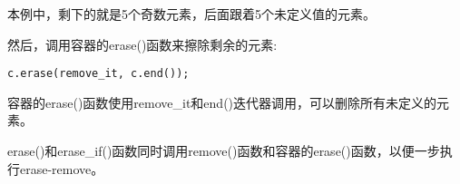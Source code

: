 本例中，剩下的就是5个奇数元素，后面跟着5个未定义值的元素。

然后，调用容器的erase()函数来擦除剩余的元素:

\begin{lstlisting}[style=styleCXX]
c.erase(remove_it, c.end());
\end{lstlisting}

容器的erase()函数使用remove\_it和end()迭代器调用，可以删除所有未定义的元素。

erase()和erase\_if()函数同时调用remove()函数和容器的erase()函数，以便一步执行erase-remove。




